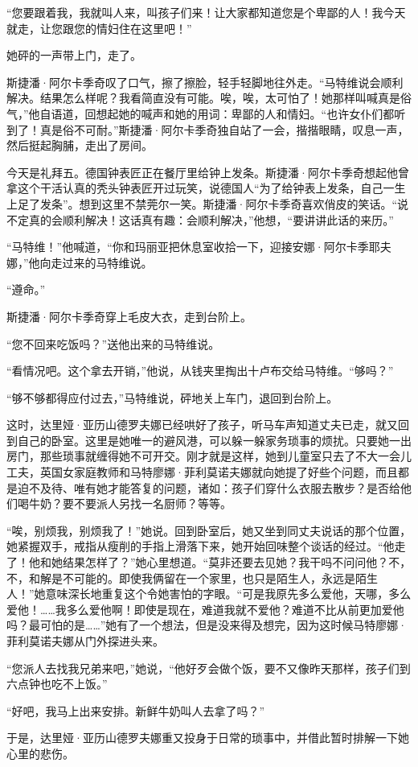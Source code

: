 \par “您要跟着我，我就叫人来，叫孩子们来！让大家都知道您是个卑鄙的人！我今天就走，让您跟您的情妇住在这里吧！”
\par 她砰的一声带上门，走了。
\par 斯捷潘·阿尔卡季奇叹了口气，擦了擦脸，轻手轻脚地往外走。“马特维说会顺利解决。结果怎么样呢？我看简直没有可能。唉，唉，太可怕了！她那样叫喊真是俗气，”他自语道，回想起她的喊声和她的用词：卑鄙的人和情妇。“也许女仆们都听到了！真是俗不可耐。”斯捷潘·阿尔卡季奇独自站了一会，揩揩眼睛，叹息一声，然后挺起胸脯，走出了房间。
\par 今天是礼拜五。德国钟表匠正在餐厅里给钟上发条。斯捷潘·阿尔卡季奇想起他曾拿这个干活认真的秃头钟表匠开过玩笑，说德国人“为了给钟表上发条，自己一生上足了发条”。想到这里不禁莞尔一笑。斯捷潘·阿尔卡季奇喜欢俏皮的笑话。“说不定真的会顺利解决！这话真有趣：会顺利解决，”他想，“要讲讲此话的来历。”
\par “马特维！”他喊道，“你和玛丽亚把休息室收拾一下，迎接安娜·阿尔卡季耶夫娜，”他向走过来的马特维说。
\par “遵命。”
\par 斯捷潘·阿尔卡季奇穿上毛皮大衣，走到台阶上。
\par “您不回来吃饭吗？”送他出来的马特维说。
\par “看情况吧。这个拿去开销，”他说，从钱夹里掏出十卢布交给马特维。“够吗？”
\par “够不够都得应付过去，”马特维说，砰地关上车门，退回到台阶上。
\par 这时，达里娅·亚历山德罗夫娜已经哄好了孩子，听马车声知道丈夫已走，就又回到自己的卧室。这里是她唯一的避风港，可以躲一躲家务琐事的烦扰。只要她一出房门，那些琐事就缠得她不可开交。刚才就是这样，她到儿童室只去了不大一会儿工夫，英国女家庭教师和马特廖娜·菲利莫诺夫娜就向她提了好些个问题，而且都是迫不及待、唯有她才能答复的问题，诸如：孩子们穿什么衣服去散步？是否给他们喝牛奶？要不要派人另找一名厨师？等等。
\par “唉，别烦我，别烦我了！”她说。回到卧室后，她又坐到同丈夫说话的那个位置，她紧握双手，戒指从瘦削的手指上滑落下来，她开始回味整个谈话的经过。“他走了！他和她结果怎样了？”她心里想道。“莫非还要去见她？我干吗不问问他？不，不，和解是不可能的。即使我俩留在一个家里，也只是陌生人，永远是陌生人！”她意味深长地重复这个令她害怕的字眼。“可是我原先多么爱他，天哪，多么爱他！……我多么爱他啊！即使是现在，难道我就不爱他？难道不比从前更加爱他吗？最可怕的是……”她有了一个想法，但是没来得及想完，因为这时候马特廖娜·菲利莫诺夫娜从门外探进头来。
\par “您派人去找我兄弟来吧，”她说，“他好歹会做个饭，要不又像昨天那样，孩子们到六点钟也吃不上饭。”
\par “好吧，我马上出来安排。新鲜牛奶叫人去拿了吗？”
\par 于是，达里娅·亚历山德罗夫娜重又投身于日常的琐事中，并借此暂时排解一下她心里的悲伤。


